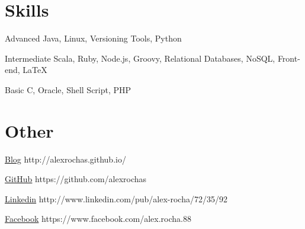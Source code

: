 \documentclass{tccv}
\begin{document}
\section{Skills}

\begin{factlist}

\item{Advanced}
    {Java, Linux, Versioning Tools, Python}

\item{Intermediate}
    {Scala, Ruby, Node.js, Groovy, Relational Databases, NoSQL, Front-end, {\LaTeX}}

\item{Basic}
    {C, Oracle, Shell Script, PHP}

\end{factlist}

\section{Other}

\begin{factlist}

\item{\href{http://alexrochas.github.io/}{Blog}}
    {http://alexrochas.github.io/}

\item{\href{https://github.com/alexrochas}{GitHub}}
    {https://github.com/alexrochas}

\item{\href{http://www.linkedin.com/pub/alex-rocha/72/35/92}{Linkedin}}
    {http://www.linkedin.com/pub/\linebreak[1]alex-rocha/72/35/92}

\item{\href{https://www.facebook.com/alex.rocha.88}{Facebook}}
{https://www.facebook.com/\linebreak[1]alex.rocha.88}

\end{factlist}
\end{document}

